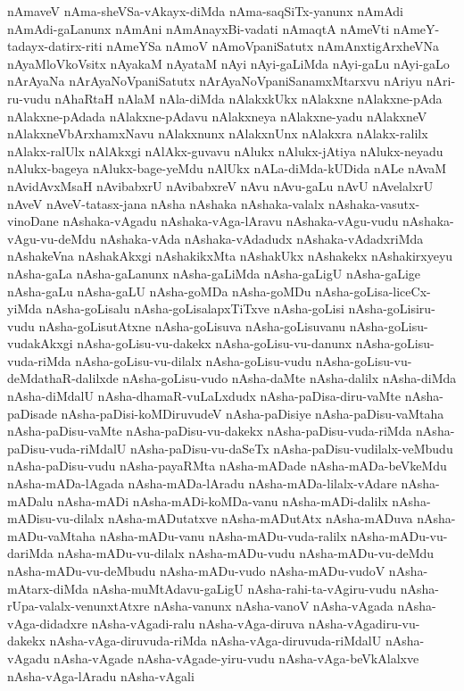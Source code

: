 {nAmaveV
nAma-sheVSa-vAkayx-diMda
nAma-saqSiTx-yanunx
nAmAdi
nAmAdi-gaLanunx
nAmAni
nAmAnayxBi-vadati
nAmaqtA
nAmeVti
nAmeY-tadayx-datirx-riti
nAmeYSa
nAmoV
nAmoVpaniSatutx
nAmAnxtigArxheVNa
nAyaMloVkoVsitx
nAyakaM
nAyataM
nAyi
nAyi-gaLiMda
nAyi-gaLu
nAyi-gaLo
nArAyaNa
nArAyaNoVpaniSatutx
nArAyaNoVpaniSanamxMtarxvu
nAriyu
nAri-ru-vudu
nAhaRtaH
nAlaM
nAla-diMda
nAlakxkUkx
nAlakxne
nAlakxne-pAda
nAlakxne-pAdada
nAlakxne-pAdavu
nAlakxneya
nAlakxne-yadu
nAlakxneV
nAlakxneVbArxhamxNavu
nAlakxnunx
nAlakxnUnx
nAlakxra
nAlakx-ralilx
nAlakx-ralUlx
nAlAkxgi
nAlAkx-guvavu
nAlukx
nAlukx-jAtiya
nAlukx-neyadu
nAlukx-bageya
nAlukx-bage-yeMdu
nAlUkx
nALa-diMda-kUDida
nALe
nAvaM
nAvidAvxMsaH
nAvibabxrU
nAvibabxreV
nAvu
nAvu-gaLu
nAvU
nAvelalxrU
nAveV
nAveV-tatasx-jana
nAsha
nAshaka
nAshaka-valalx
nAshaka-vasutx-vinoDane
nAshaka-vAgadu
nAshaka-vAga-lAravu
nAshaka-vAgu-vudu
nAshaka-vAgu-vu-deMdu
nAshaka-vAda
nAshaka-vAdadudx
nAshaka-vAdadxriMda
nAshakeVna
nAshakAkxgi
nAshakikxMta
nAshakUkx
nAshakekx
nAshakirxyeyu
nAsha-gaLa
nAsha-gaLanunx
nAsha-gaLiMda
nAsha-gaLigU
nAsha-gaLige
nAsha-gaLu
nAsha-gaLU
nAsha-goMDa
nAsha-goMDu
nAsha-goLisa-liceCx-yiMda
nAsha-goLisalu
nAsha-goLisalapxTiTxve
nAsha-goLisi
nAsha-goLisiru-vudu
nAsha-goLisutAtxne
nAsha-goLisuva
nAsha-goLisuvanu
nAsha-goLisu-vudakAkxgi
nAsha-goLisu-vu-dakekx
nAsha-goLisu-vu-danunx
nAsha-goLisu-vuda-riMda
nAsha-goLisu-vu-dilalx
nAsha-goLisu-vudu
nAsha-goLisu-vu-deMdathaR-dalilxde
nAsha-goLisu-vudo
nAsha-daMte
nAsha-dalilx
nAsha-diMda
nAsha-diMdalU
nAsha-dhamaR-vuLaLxdudx
nAsha-paDisa-diru-vaMte
nAsha-paDisade
nAsha-paDisi-koMDiruvudeV
nAsha-paDisiye
nAsha-paDisu-vaMtaha
nAsha-paDisu-vaMte
nAsha-paDisu-vu-dakekx
nAsha-paDisu-vuda-riMda
nAsha-paDisu-vuda-riMdalU
nAsha-paDisu-vu-daSeTx
nAsha-paDisu-vudilalx-veMbudu
nAsha-paDisu-vudu
nAsha-payaRMta
nAsha-mADade
nAsha-mADa-beVkeMdu
nAsha-mADa-lAgada
nAsha-mADa-lAradu
nAsha-mADa-lilalx-vAdare
nAsha-mADalu
nAsha-mADi
nAsha-mADi-koMDa-vanu
nAsha-mADi-dalilx
nAsha-mADisu-vu-dilalx
nAsha-mADutatxve
nAsha-mADutAtx
nAsha-mADuva
nAsha-mADu-vaMtaha
nAsha-mADu-vanu
nAsha-mADu-vuda-ralilx
nAsha-mADu-vu-dariMda
nAsha-mADu-vu-dilalx
nAsha-mADu-vudu
nAsha-mADu-vu-deMdu
nAsha-mADu-vu-deMbudu
nAsha-mADu-vudo
nAsha-mADu-vudoV
nAsha-mAtarx-diMda
nAsha-muMtAdavu-gaLigU
nAsha-rahi-ta-vAgiru-vudu
nAsha-rUpa-valalx-venunxtAtxre
nAsha-vanunx
nAsha-vanoV
nAsha-vAgada
nAsha-vAga-didadxre
nAsha-vAgadi-ralu
nAsha-vAga-diruva
nAsha-vAgadiru-vu-dakekx
nAsha-vAga-diruvuda-riMda
nAsha-vAga-diruvuda-riMdalU
nAsha-vAgadu
nAsha-vAgade
nAsha-vAgade-yiru-vudu
nAsha-vAga-beVkAlalxve
nAsha-vAga-lAradu
nAsha-vAgali
}

